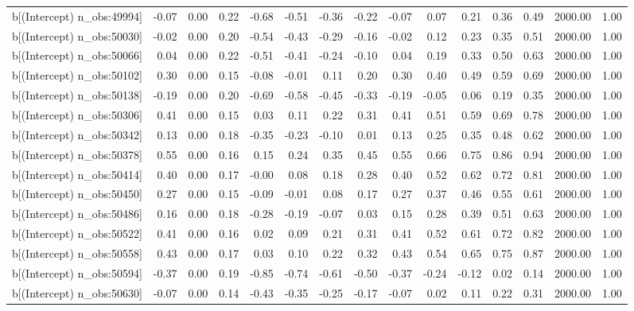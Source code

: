 \begin{table}[ht]
\begin{tabular}{rrrrrrrrrrrrrrr}
  b[(Intercept) n\_obs:49994] & -0.07 & 0.00 & 0.22 & -0.68 & -0.51 & -0.36 & -0.22 & -0.07 & 0.07 & 0.21 & 0.36 & 0.49 & 2000.00 & 1.00 \\ 
  b[(Intercept) n\_obs:50030] & -0.02 & 0.00 & 0.20 & -0.54 & -0.43 & -0.29 & -0.16 & -0.02 & 0.12 & 0.23 & 0.35 & 0.51 & 2000.00 & 1.00 \\ 
  b[(Intercept) n\_obs:50066] & 0.04 & 0.00 & 0.22 & -0.51 & -0.41 & -0.24 & -0.10 & 0.04 & 0.19 & 0.33 & 0.50 & 0.63 & 2000.00 & 1.00 \\ 
  b[(Intercept) n\_obs:50102] & 0.30 & 0.00 & 0.15 & -0.08 & -0.01 & 0.11 & 0.20 & 0.30 & 0.40 & 0.49 & 0.59 & 0.69 & 2000.00 & 1.00 \\ 
  b[(Intercept) n\_obs:50138] & -0.19 & 0.00 & 0.20 & -0.69 & -0.58 & -0.45 & -0.33 & -0.19 & -0.05 & 0.06 & 0.19 & 0.35 & 2000.00 & 1.00 \\ 
  b[(Intercept) n\_obs:50306] & 0.41 & 0.00 & 0.15 & 0.03 & 0.11 & 0.22 & 0.31 & 0.41 & 0.51 & 0.59 & 0.69 & 0.78 & 2000.00 & 1.00 \\ 
  b[(Intercept) n\_obs:50342] & 0.13 & 0.00 & 0.18 & -0.35 & -0.23 & -0.10 & 0.01 & 0.13 & 0.25 & 0.35 & 0.48 & 0.62 & 2000.00 & 1.00 \\ 
  b[(Intercept) n\_obs:50378] & 0.55 & 0.00 & 0.16 & 0.15 & 0.24 & 0.35 & 0.45 & 0.55 & 0.66 & 0.75 & 0.86 & 0.94 & 2000.00 & 1.00 \\ 
  b[(Intercept) n\_obs:50414] & 0.40 & 0.00 & 0.17 & -0.00 & 0.08 & 0.18 & 0.28 & 0.40 & 0.52 & 0.62 & 0.72 & 0.81 & 2000.00 & 1.00 \\ 
  b[(Intercept) n\_obs:50450] & 0.27 & 0.00 & 0.15 & -0.09 & -0.01 & 0.08 & 0.17 & 0.27 & 0.37 & 0.46 & 0.55 & 0.61 & 2000.00 & 1.00 \\ 
  b[(Intercept) n\_obs:50486] & 0.16 & 0.00 & 0.18 & -0.28 & -0.19 & -0.07 & 0.03 & 0.15 & 0.28 & 0.39 & 0.51 & 0.63 & 2000.00 & 1.00 \\ 
  b[(Intercept) n\_obs:50522] & 0.41 & 0.00 & 0.16 & 0.02 & 0.09 & 0.21 & 0.31 & 0.41 & 0.52 & 0.61 & 0.72 & 0.82 & 2000.00 & 1.00 \\ 
  b[(Intercept) n\_obs:50558] & 0.43 & 0.00 & 0.17 & 0.03 & 0.10 & 0.22 & 0.32 & 0.43 & 0.54 & 0.65 & 0.75 & 0.87 & 2000.00 & 1.00 \\ 
  b[(Intercept) n\_obs:50594] & -0.37 & 0.00 & 0.19 & -0.85 & -0.74 & -0.61 & -0.50 & -0.37 & -0.24 & -0.12 & 0.02 & 0.14 & 2000.00 & 1.00 \\ 
  b[(Intercept) n\_obs:50630] & -0.07 & 0.00 & 0.14 & -0.43 & -0.35 & -0.25 & -0.17 & -0.07 & 0.02 & 0.11 & 0.22 & 0.31 & 2000.00 & 1.00 \\ 

\end{tabular}
\end{table}
